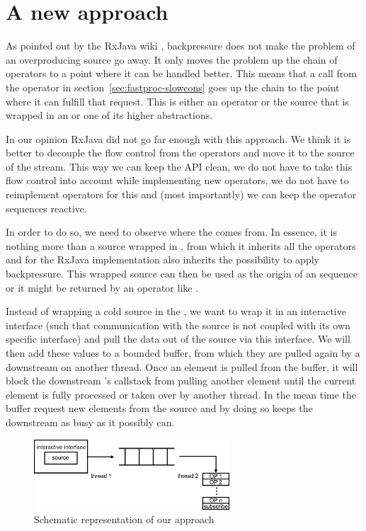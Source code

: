 \section{A new approach}
As pointed out by the RxJava wiki \cite{RxJava-Wiki-Backpressure}, backpressure does not make the problem of an overproducing source go away. It only moves the problem up the chain of operators to a point where it can be handled better. This means that a  call from the  operator in section~\ref{sec:fastproc-slowcons} goes up the chain to the point where it can fulfill that request. This is either an operator or the source that is wrapped in an  or one of its higher abstractions.

In our opinion RxJava did not go far enough with this approach. We think it is better to decouple the flow control from the operators and move it to the source of the stream. This way we can keep the API clean, we do not have to take this flow control into account while implementing new operators, we do not have to reimplement operators for this and (most importantly) we can keep the operator sequences reactive.

In order to do so, we need to observe where the \obs comes from. In essence, it is nothing more than a source wrapped in , from which it inherits all the operators and for the RxJava implementation also inherits the possibility to apply backpressure. This wrapped source can then be used as the origin of an \obs sequence or it might be returned by an operator like .

Instead of wrapping a cold source in the , we want to wrap it in an interactive interface (such that communication with the source is not coupled with its own specific interface) and pull the data out of the source via this interface. We will then add these values to a bounded buffer, from which they are pulled again by a downstream \obs on another thread. Once an element is pulled from the buffer, it will block the downstream \obs's callstack from pulling another element until the current element is fully processed or taken over by another thread. In the mean time the buffer request new elements from the source and by doing so keeps the downstream \obs as busy as it possibly can.

\begin{figure}[H]
	\begin{center}
		\includegraphics[width=0.65\textwidth]{figures/Approach.png}
	\end{center}
	\label{fig:new-approach}
	\caption{Schematic representation of our approach}
\end{figure}

